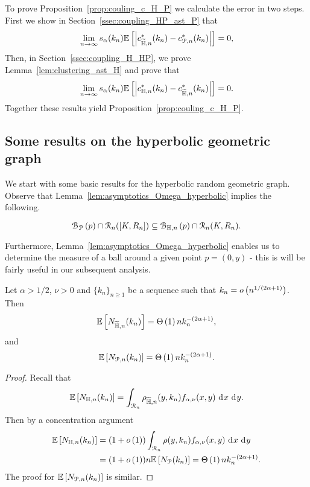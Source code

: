 To prove Proposition~\ref{prop:couling_c_H_P} we calculate the error in two steps. First we show in Section~\ref{ssec:coupling_HP_ast_P} that
\[
	\lim_{n \to \infty} s_\alpha(k_n) \mathbb{E}\left[\left|c_{\widetilde{\mathbb{H}},n}^\ast(k_n) - c_{{\mathcal P},n}^\ast(k_n)\right|\right] = 0,
\]
Then, in Section~\ref{ssec:coupling_H_HP}, we prove Lemma~\ref{lem:clustering_ast_H} and prove that
\[
	\lim_{n \to \infty} s_\alpha(k_n) \mathbb{E}\left[\left| c_{\mathbb{H},n}^\ast(k_n) - c_{\widetilde{\mathbb{H}},n}^\ast(k_n)\right|\right] = 0.
\]
Together these results yield Proposition~\ref{prop:couling_c_H_P}.

\subsection{Some results on the hyperbolic geometric graph}

We start with some basic results for the hyperbolic random geometric graph. Observe that Lemma~\ref{lem:asymptotics_Omega_hyperbolic} implies the following. 
\begin{corollary}\label{cor:balls_inclusion}
\begin{equation*}
 {\mathcal B}_{{\mathcal P}}\left(p\right) \cap {\mathcal R}_n ([K,R_n]) \subseteq {\mathcal B}_{\mathbb{H},n}\left(p\right) \cap {\mathcal R}_n (K,R_n). 
\end{equation*}
\end{corollary}


Furthermore, Lemma~\ref{lem:asymptotics_Omega_hyperbolic} enables us to determine the measure of a ball around a given point $p=(0,y)$ - this is will be fairly useful in our subsequent analysis. 

\begin{lemma}
Let $\alpha > 1/2$, $\nu > 0$ and $\{k_n\}_{n\ge 1}$ be a sequence such that $k_n = o\left(n^{1/(2\alpha + 1)}\right)$. Then
\begin{equation} \label{eq:n_k_Hyp}
	\mathbb{E}\left[N_{\widetilde{\mathbb{H}},n}(k_n)\right] = \Theta\left(1\right) n k_n^{-(2\alpha + 1)},
\end{equation}
and
\begin{equation} \label{eq:n_k_Po}
	\mathbb{E}\left[N_{{\mathcal P},n}(k_n)\right] = \Theta\left(1\right) n k_n^{-(2\alpha + 1)}.
\end{equation}
\end{lemma}

\begin{proof}
Recall that
\[
	\mathbb{E}\left[N_{\mathbb{H},n}(k_n)\right] = \int_{{\mathcal R}_n} \rho_{\widetilde{\mathbb{H}},n}(y,k_n) f_{\alpha,\nu}(x,y) \operatorname{\, \mathrm{d}\hspace{-1pt}} x \operatorname{\, \mathrm{d}\hspace{-1pt}} y. 
\]
Then by a concentration argument
\begin{align*}
	\mathbb{E}\left[N_{\mathbb{H},n}(k_n)\right] &= (1 + o\left(1\right))\int_{{\mathcal R}_n} \rho(y,k_n) f_{\alpha,\nu}(x,y) \operatorname{\, \mathrm{d}\hspace{-1pt}} x \operatorname{\, \mathrm{d}\hspace{-1pt}} y\\
	&= (1 + o\left(1\right)) n\mathbb{E}\left[N_{{\mathcal P}}(k_n)\right] = \Theta\left(1\right)n k_n^{-(2\alpha + 1)}.
\end{align*}
The proof for $\mathbb{E}\left[N_{{\mathcal P},n}(k_n)\right]$ is similar.
\end{proof}

